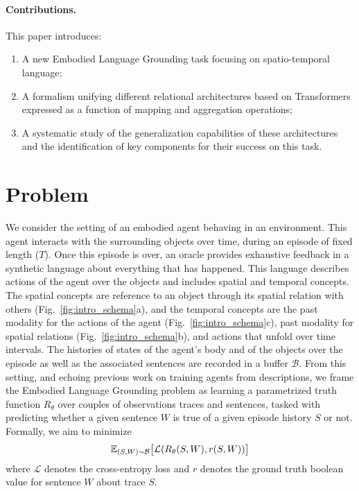 \paragraph{Contributions.} This paper introduces:

\begin{enumerate}[noitemsep]
    \item A new Embodied Language Grounding task focusing on spatio-temporal language;
    \item A formalism unifying different relational architectures based on Transformers expressed as a function of mapping and aggregation operations;
    \item A systematic study of the generalization capabilities of these architectures and the identification of key components for their success on this task.
\end{enumerate}

\section{Problem}

We consider the setting of an embodied agent behaving in an environment. This agent interacts with the surrounding objects over time, during an episode of fixed length ($T$). Once this episode is over, an oracle provides exhaustive feedback in a synthetic language about everything that has happened. This language describes actions of the agent over the objects and includes spatial and temporal concepts. The spatial concepts are reference to an object through its spatial relation with others (Fig.~\ref{fig:intro_schema}a), and the temporal concepts are the past modality for the actions of the agent (Fig.~\ref{fig:intro_schema}c), past modality for spatial relations (Fig.~\ref{fig:intro_schema}b), and actions that unfold over time intervals. The histories of states of the agent's body and of the objects over the episode as well as the associated sentences are recorded in a buffer $\mathcal{B}$. From this setting, and echoing previous work on training agents from descriptions, we frame the Embodied Language Grounding problem as learning a parametrized truth function $R_{\theta}$ over couples of observations traces  and sentences, tasked with predicting whether a given sentence $W$ is true of a given episode history $S$ or not. Formally, we aim to minimize
%
\[\mathbb{E}_{(S, W) \sim  \mathcal{B}}\big{[}\mathcal{L}(R_{\theta}(S, W), r(S,W))\big{]}
\]
where $\mathcal{L}$ denotes the cross-entropy loss and $r$ denotes the ground truth boolean value for sentence $W$ about trace $S$.

